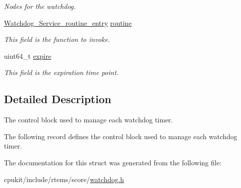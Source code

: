 \begin{DoxyCompactItemize}
\begin{tabbing}
\end{tabbing}\begin{DoxyCompactList}\small\item\em Nodes for the watchdog. \end{DoxyCompactList}\item 
\mbox{\label{structWatchdog__Control_a845fcc6a1fc24cec7adf50f866288a48}} 
\mbox{\hyperlink{group__RTEMSScoreWatchdog_ga6ae5e52f6c4046535272c18a8cba66e1}{Watchdog\+\_\+\+Service\+\_\+routine\+\_\+entry}} \mbox{\hyperlink{structWatchdog__Control_a845fcc6a1fc24cec7adf50f866288a48}{routine}}
\begin{DoxyCompactList}\small\item\em This field is the function to invoke. \end{DoxyCompactList}\item 
\mbox{\label{structWatchdog__Control_a399d7caa6100609d051eafc20ccb0d60}} 
uint64\+\_\+t \mbox{\hyperlink{structWatchdog__Control_a399d7caa6100609d051eafc20ccb0d60}{expire}}
\begin{DoxyCompactList}\small\item\em This field is the expiration time point. \end{DoxyCompactList}\end{DoxyCompactItemize}


\subsection{Detailed Description}
The control block used to manage each watchdog timer. 

The following record defines the control block used to manage each watchdog timer. 

The documentation for this struct was generated from the following file\+:\begin{DoxyCompactItemize}
\item 
cpukit/include/rtems/score/\mbox{\hyperlink{cpukit_2include_2rtems_2score_2watchdog_8h}{watchdog.\+h}}\end{DoxyCompactItemize}
